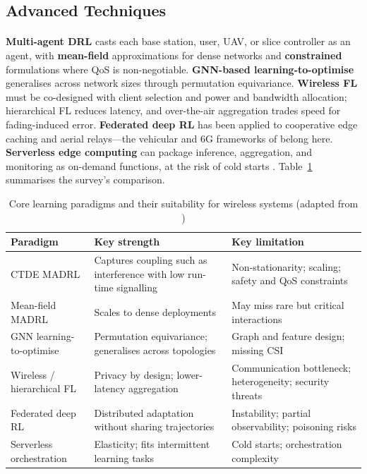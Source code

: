 \documentclass[12pt,a4paper,final]{extreport}
\begin{document}
\subsection{Advanced Techniques}

\paragraph{} \textbf{Multi-agent DRL} casts each base station, user, UAV, or slice controller as an agent, with \textbf{mean-field} approximations for dense networks and \textbf{constrained} formulations where QoS is non-negotiable. \textbf{GNN-based learning-to-optimise} generalises across network sizes through permutation equivariance. \textbf{Wireless FL} must be co-designed with client selection and power and bandwidth allocation; hierarchical FL reduces latency, and over-the-air aggregation trades speed for fading-induced error. \textbf{Federated deep RL} has been applied to cooperative edge caching and aerial relays---the vehicular and 6G frameworks of \cite{p1,p2} belong here. \textbf{Serverless edge computing} can package inference, aggregation, and monitoring as on-demand functions, at the risk of cold starts \cite{p3}. Table~\ref{tab:p3_paradigms} summarises the survey's comparison.

{\renewcommand{\arraystretch}{1.15}
\begin{table}[htbp]
\centering
\caption{Core learning paradigms and their suitability for wireless systems (adapted from \cite{p3})}\label{tab:p3_paradigms}
\small
\begin{tabularx}{\textwidth}{|p{2.6cm}|X|X|}
\hline
\textbf{Paradigm} & \textbf{Key strength} & \textbf{Key limitation} \\ \hline
CTDE MADRL & Captures coupling such as interference with low run-time signalling & Non-stationarity; scaling; safety and QoS constraints \\ \hline
Mean-field MADRL & Scales to dense deployments & May miss rare but critical interactions \\ \hline
GNN learning-to-optimise & Permutation equivariance; generalises across topologies & Graph and feature design; missing CSI \\ \hline
Wireless / hierarchical FL & Privacy by design; lower-latency aggregation & Communication bottleneck; heterogeneity; security threats \\ \hline
Federated deep RL & Distributed adaptation without sharing trajectories & Instability; partial observability; poisoning risks \\ \hline
Serverless orchestration & Elasticity; fits intermittent learning tasks & Cold starts; orchestration complexity \\ \hline
\end{tabularx}
\end{table}}
\end{document}
